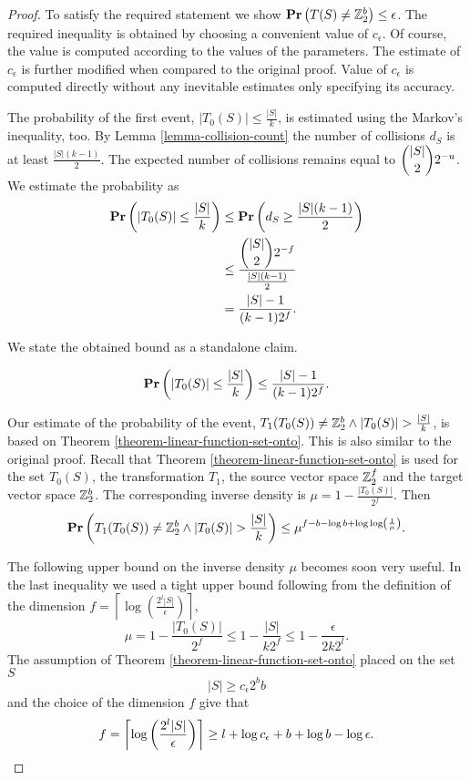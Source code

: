 \begin{proof}
To satisfy the required statement we show $\mathbf{Pr}\left(T(S) \neq \mathbb{Z}_{2}^{b}\right) \leq \epsilon$. The required inequality is obtained by choosing a convenient value of $c_{\epsilon}$. Of course, the value is computed according to the values of the parameters. The estimate of $c_{\epsilon}$ is further modified when compared to the original proof. Value of $c_{\epsilon}$ is computed directly without any inevitable estimates only specifying its accuracy.

The probability of the first event, $|T_0(S)| \leq \frac{|S|}{k}$, is estimated using the Markov's inequality, too. By Lemma \ref{lemma-collision-count} the number of collisions $d_S$ is at least $\frac{|S|(k - 1)}{2}$. The expected number of collisions remains equal to $\dbinom{|S|}{2}2 ^ {-u}$. We estimate the probability as 
\[
\begin{split}
\mathbf{Pr}\left(|T_0(S)| \leq \frac{|S|}{k}\right) 
	& \leq \mathbf{Pr}\left(d_S \geq \frac{|S|(k - 1)}{2}\right) \\
	& \leq \frac{\dbinom{|S|}{2}2 ^ {-f}}{\frac{|S|(k - 1)}{2}} \\
	& = \frac{|S| - 1}{(k - 1) 2 ^ f} \text{.}
\end{split}
\]

We state the obtained bound as a standalone claim.
\begin{claim}
\label{claim-event-1}
\[
	\mathbf{Pr}\left(|T_0(S)| \leq \frac{|S|}{k}\right) \leq \frac{|S| - 1}{(k - 1) 2 ^ f} \text{.}
\]
\end{claim}

Our estimate of the probability of the event, $T_1(T_0(S)) \neq \mathbb{Z}_{2}^{b} \wedge |T_0(S)| > \frac{|S|}{k}$, is based on Theorem \ref{theorem-linear-function-set-onto}. This is also similar to the original proof. Recall that Theorem \ref{theorem-linear-function-set-onto} is used for the set $T_0(S)$, the transformation $T_1$, the source vector space $\mathbb{Z}_{2}^{f}$ and the target vector space $\mathbb{Z}_{2}^{b}$. The corresponding inverse density is $\mu = 1 - \frac{|T_0(S)|}{2 ^ f}$. Then
\[
\mathbf{Pr}\left(T_1(T_0(S)) \neq \mathbb{Z}_{2}^{b} \wedge |T_0(S)| > \frac{|S|}{k}\right) \leq \mu ^ {f - b - \log b + \log \log \left(\frac{1}{\mu}\right)} \text{.}
\]

The following upper bound on the inverse density $\mu$ becomes soon very useful. In the last inequality we used a tight upper bound following from the definition of the dimension $f = \left\lceil \log\left(\frac{2 ^ l|S|}{\epsilon}\right) \right\rceil$,
\[
	\mu = 1 - \frac{|T_0(S)|}{2 ^ f} \leq 1 - \frac{|S|}{k 2 ^ f} \leq 1 - \frac{\epsilon}{2 k 2 ^ l} \text{.}
\]
The assumption of Theorem \ref{theorem-linear-function-set-onto} placed on the set $S$ 
\[
	|S| \geq c_\epsilon 2 ^ b b 
\]
and the choice of the dimension $f$ give that 
\[
	f = \left\lceil \log \left(\frac{2^l |S|}{\epsilon}\right) \right\rceil \geq l + \log c_\epsilon + b + \log b - \log \epsilon \text{.} \\
\]


\end{proof}
